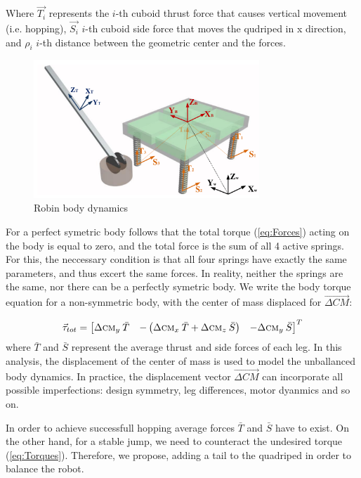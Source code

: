 Where $\vec{T_{i}}$ represents the $i$-th cuboid thrust force that causes vertical movement (i.e. hopping), $\vec{S_{i}}$ $i$-th cuboid side force that moves the qudriped in x direction, and $\rho _i$ $i$-th distance between the geometric center and the forces.

\begin{figure}
	\centering
	\includegraphics[width=85mm]{./pictures/RobinMoment.pdf}
	\caption{Robin body dynamics}
	\label{fig:rmoment}
\end{figure}

For a perfect symetric body follows that the total torque (\ref{eq:Forces}) acting on the body is equal to zero, and the total force is the sum of all 4 active springs. For this, the neccessary condition is that all four springs have exactly the same parameters, and thus excert the same forces. In reality, neither the springs are the same, nor there can be a perfectly symetric body. We write the body torque equation for a non-symmetric body, with the center of mass displaced for $\vec{\Delta CM}$:

\begin{equation}\label{eq:Torques}
\vec{\tau}_{tot}=\begin{bmatrix}
\Delta \textsc{cm}_y \:\bar{T} & -\left ( \Delta \textsc{cm}_x \:\bar{T} +\Delta \textsc{cm}_z \:\bar{S}\right ) & -\Delta \textsc{cm}_y \:\bar{S}
\end{bmatrix}^T
\end{equation}
where $\bar{T}$ and $\bar{S}$ represent the average thrust and side forces of each leg. In this analysis, the displacement of the center of mass is used to model the unballanced body dynamics. In practice, the displacement vector  $\vec{\Delta CM}$ can incorporate all possible imperfections: design symmetry, leg differences, motor dyanmics and so on.  

In order to achieve successfull hopping average forces $\bar{T}$ and $\bar{S}$ have to exist. On the other hand, for a stable jump, we need to counteract the undesired torque (\ref{eq:Torques}). Therefore, we propose, adding a tail to the quadriped in order to balance the robot. 

